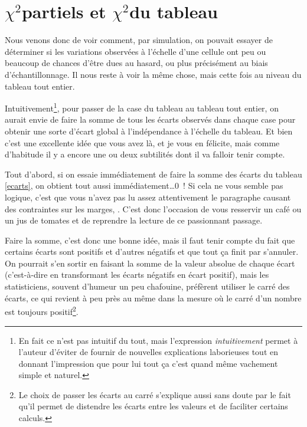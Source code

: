 \documentclass[a4paper,10pt,twoside,francais]{report}
\newcommand{\chidpdf}{\texorpdfstring{$\chi^2$\xspace}{X\texttwosuperior\xspace}}
\begin{document}
\section{\chidpdf partiels et \chidpdf du tableau} 
\label{ssec-chidpartiels}

Nous venons donc de voir comment, par simulation, on pouvait essayer
de déterminer si les variations observées à l'échelle d'une cellule
ont peu ou beaucoup de chances d'être dues au hasard, ou plus
précisément au biais d'échantillonnage. Il nous reste à voir la même
chose, mais cette fois au niveau du tableau tout entier.

Intuitivement\footnote{En fait ce n'est pas intuitif du tout, mais
  l'expression \textit{intuitivement} permet à l'auteur d'éviter de
  fournir de nouvelles explications laborieuses tout en donnant
  l'impression que pour lui tout ça c'est quand même vachement simple
  et naturel.},  pour passer de la case du tableau au tableau tout
entier, on aurait envie de faire la somme de tous les écarts observés
dans chaque case pour obtenir une sorte d'écart global à
l'indépendance à l'échelle du tableau. Et bien c'est une excellente
idée que vous avez là, et je vous en félicite, mais comme d'habitude
il y a encore une ou deux subtilités dont il va falloir tenir compte.

Tout d'abord, si on essaie immédiatement de faire la somme des écarts
du tableau \vref{ecarts}, on obtient tout aussi
immédiatement\ldots 0~! Si cela ne vous semble pas logique, c'est que
vous n'avez pas lu assez attentivement le paragraphe causant des
contraintes sur les marges, . C'est donc
l'occasion de vous resservir un café ou un jus de tomates et de
reprendre la lecture de ce passionnant passage.

Faire la somme, c'est donc une bonne idée, mais il faut tenir compte
du fait que certains écarts sont positifs et d'autres négatifs et que
tout ça finit par s'annuler. On pourrait s'en sortir en faisant la
somme de la valeur absolue de chaque écart (c'est-à-dire en
transformant les écarts négatifs en écart positif), mais les
statisticiens, souvent d'humeur un peu chafouine, préfèrent utiliser
le carré des écarts, ce qui revient à peu près au même dans la mesure
où le carré d'un nombre est toujours positif\footnote{Le choix de
  passer les écarts au carré s'explique aussi sans doute par le fait
  qu'il permet de distendre les écarts entre les valeurs et de
  faciliter certains calculs.}.
\end{document}
